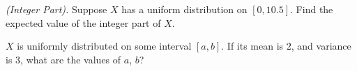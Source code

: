 \begin{problem}[Handout 12, \# 22]
  \emph{(Integer Part).} Suppose \(X\) has a uniform distribution on
  \([0,10.5]\). Find the expected value of the integer part of \(X\).
\end{problem}
\begin{solution}

\end{solution}
\newpage

\begin{problem}[Handout 12, \# 23]
  \(X\) is uniformly distributed on some interval \([a,b]\). If its mean is
  \(2\), and variance is \(3\), what are the values of \(a\), \(b\)?
\end{problem}
\begin{solution}

\end{solution}

